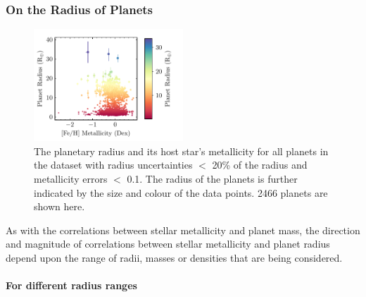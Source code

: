\documentclass[a4paper,twocolumn,12pt]{article}
\begin{document}





\subsubsection{On the Radius of Planets}

\begin{figure}[h!]
    \centering
    \includegraphics[width=0.5\textwidth]{Graphs/FeH vs Radius Planet Plot.pdf}
    \caption{The planetary radius and its host star's metallicity for all planets in the dataset with radius uncertainties $<$ 20\% of the radius and metallicity errors $<$ 0.1. The radius of the planets is further indicated by the size and colour of the data points. 2466 planets are shown here.}
    \label{figure: Fe/H vs radius parameter plot}
\end{figure}

As with the correlations between stellar metallicity and planet mass, the direction and magnitude of correlations between stellar metallicity and planet radius depend upon the range of radii, masses or densities that are being considered.




\paragraph{For different radius ranges}
\end{document}
